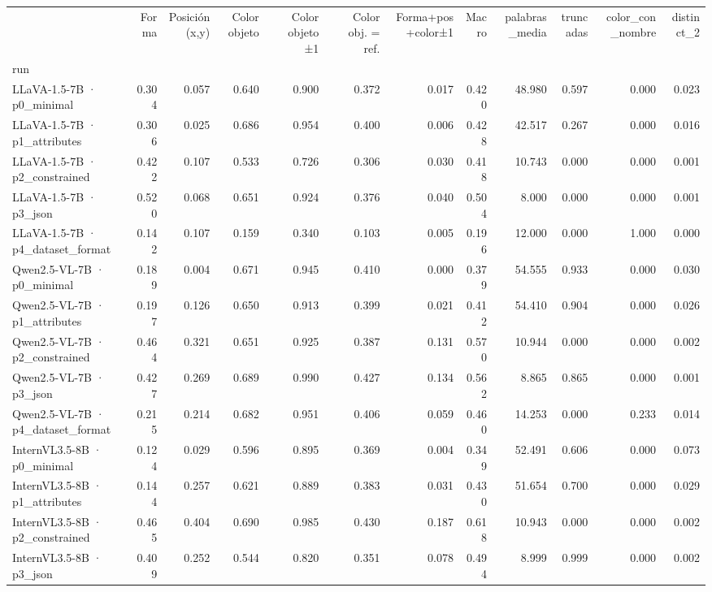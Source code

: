 \begin{tabular}{lrrrrrrrrrrr}
\toprule
 & Forma & Posición (x,y) & Color objeto & Color objeto ±1 & Color obj. = ref. & Forma+pos+color±1 & Macro & palabras\_media & truncadas & color\_con\_nombre & distinct\_2 \\
run &  &  &  &  &  &  &  &  &  &  &  \\
\midrule
LLaVA-1.5-7B · p0\_minimal & 0.304 & 0.057 & 0.640 & 0.900 & 0.372 & 0.017 & 0.420 & 48.980 & 0.597 & 0.000 & 0.023 \\
LLaVA-1.5-7B · p1\_attributes & 0.306 & 0.025 & 0.686 & 0.954 & 0.400 & 0.006 & 0.428 & 42.517 & 0.267 & 0.000 & 0.016 \\
LLaVA-1.5-7B · p2\_constrained & 0.422 & 0.107 & 0.533 & 0.726 & 0.306 & 0.030 & 0.418 & 10.743 & 0.000 & 0.000 & 0.001 \\
LLaVA-1.5-7B · p3\_json & 0.520 & 0.068 & 0.651 & 0.924 & 0.376 & 0.040 & 0.504 & 8.000 & 0.000 & 0.000 & 0.001 \\
LLaVA-1.5-7B · p4\_dataset\_format & 0.142 & 0.107 & 0.159 & 0.340 & 0.103 & 0.005 & 0.196 & 12.000 & 0.000 & 1.000 & 0.000 \\
Qwen2.5-VL-7B · p0\_minimal & 0.189 & 0.004 & 0.671 & 0.945 & 0.410 & 0.000 & 0.379 & 54.555 & 0.933 & 0.000 & 0.030 \\
Qwen2.5-VL-7B · p1\_attributes & 0.197 & 0.126 & 0.650 & 0.913 & 0.399 & 0.021 & 0.412 & 54.410 & 0.904 & 0.000 & 0.026 \\
Qwen2.5-VL-7B · p2\_constrained & 0.464 & 0.321 & 0.651 & 0.925 & 0.387 & 0.131 & 0.570 & 10.944 & 0.000 & 0.000 & 0.002 \\
Qwen2.5-VL-7B · p3\_json & 0.427 & 0.269 & 0.689 & 0.990 & 0.427 & 0.134 & 0.562 & 8.865 & 0.865 & 0.000 & 0.001 \\
Qwen2.5-VL-7B · p4\_dataset\_format & 0.215 & 0.214 & 0.682 & 0.951 & 0.406 & 0.059 & 0.460 & 14.253 & 0.000 & 0.233 & 0.014 \\
InternVL3.5-8B · p0\_minimal & 0.124 & 0.029 & 0.596 & 0.895 & 0.369 & 0.004 & 0.349 & 52.491 & 0.606 & 0.000 & 0.073 \\
InternVL3.5-8B · p1\_attributes & 0.144 & 0.257 & 0.621 & 0.889 & 0.383 & 0.031 & 0.430 & 51.654 & 0.700 & 0.000 & 0.029 \\
InternVL3.5-8B · p2\_constrained & 0.465 & 0.404 & 0.690 & 0.985 & 0.430 & 0.187 & 0.618 & 10.943 & 0.000 & 0.000 & 0.002 \\
InternVL3.5-8B · p3\_json & 0.409 & 0.252 & 0.544 & 0.820 & 0.351 & 0.078 & 0.494 & 8.999 & 0.999 & 0.000 & 0.002 \\

\end{tabular}
